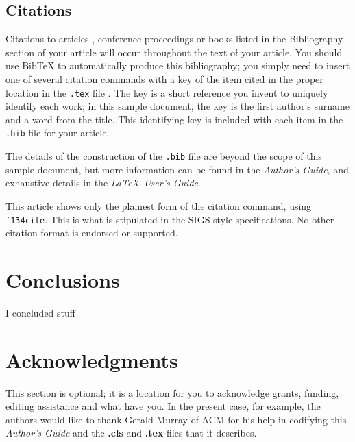 \documentclass{sig-alternate}
\begin{document}
 
\subsection{Citations}
Citations to articles \cite{bowman:reasoning,
clark:pct, braams:babel, herlihy:methodology},
conference proceedings \cite{clark:pct} or
books \cite{salas:calculus, Lamport:LaTeX} listed
in the Bibliography section of your
article will occur throughout the text of your article.
You should use BibTeX to automatically produce this bibliography;
you simply need to insert one of several citation commands with
a key of the item cited in the proper location in
the \texttt{.tex} file \cite{Lamport:LaTeX}.
The key is a short reference you invent to uniquely
identify each work; in this sample document, the key is
the first author's surname and a
word from the title.  This identifying key is included
with each item in the \texttt{.bib} file for your article.

The details of the construction of the \texttt{.bib} file
are beyond the scope of this sample document, but more
information can be found in the \textit{Author's Guide},
and exhaustive details in the \textit{\LaTeX\ User's
Guide}\cite{Lamport:LaTeX}.

This article shows only the plainest form
of the citation command, using \texttt{{\char'134}cite}.
This is what is stipulated in the SIGS style specifications.
No other citation format is endorsed or supported.

\section{Conclusions}
I concluded stuff

\section{Acknowledgments}
This section is optional; it is a location for you
to acknowledge grants, funding, editing assistance and
what have you.  In the present case, for example, the
authors would like to thank Gerald Murray of ACM for
his help in codifying this \textit{Author's Guide}
and the \textbf{.cls} and \textbf{.tex} files that it describes.

%

%
%
\end{document}
